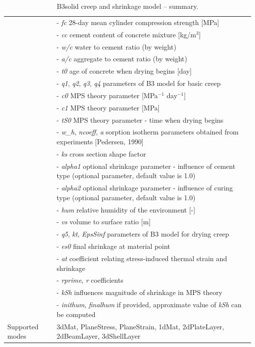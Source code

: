 \documentclass[a4paper]{article}
\newcommand{\param}[1]{{\it #1}}
\begin{document}
\begin{table}
\begin{tabular}{|l|p{9cm}|}
\hline
&- \param{fc} 28-day mean cylinder compression strength [MPa]\\
&- \param{cc} cement content of concrete mixture  [kg/m$^{3}$] \\
&- \param{w/c} water to cement ratio (by weight)\\
&- \param{a/c} aggregate to cement ratio (by weight)\\
&- \param{t0} age of concrete when drying begins [day]\\
&- \param{q1}, \param{q2}, \param{q3}, \param{q4} parameters of B3 model for basic creep\\

&- \param{c0} MPS theory parameter [MPa$^{-1}$ day$^{-1}$] \\
&- \param{c1} MPS theory parameter [MPa]\\
&- \param{tS0} MPS theory parameter - time when drying begins \\
&- \param{w\_h}, \param{ncoeff}, \param{a} sorption isotherm parameters obtained from experiments [Pedersen, 1990] \\

&- \param{ks} cross section shape factor \\
&- \param{alpha1} optional shrinkage parameter - influence of cement type (optional parameter, default value is 1.0)\\
&- \param{alpha2} optional shrinkage parameter - influence of curing type (optional parameter, default value is 1.0)\\
&- \param{hum} relative humidity of the environment [-]\\
&- \param{vs} volume to surface ratio [m]\\
&- \param{q5}, \param{kt}, \param{EpsSinf} parameters of B3 model for drying creep\\

&- \param{es0} final shrinkage at material point\\
&- \param{at} coefficient relating stress-induced thermal strain and shrinkage\\
&- \param{rprime}, \param{r} coefficients\\

&- \param{kSh} influences magnitude of shrinkage in MPS theory\\
&- \param{inithum}, \param{finalhum} if provided, approximate value of \param{kSh} can be computed\\


Supported modes& 3dMat, PlaneStress, PlaneStrain, 1dMat,
2dPlateLayer, 2dBeamLayer, 3dShellLayer\\
\hline
\end{tabular}

\caption{B3solid creep and shrinkage model -- summary.}
\label{b3solid_table}

\end{table}
\end{document}
